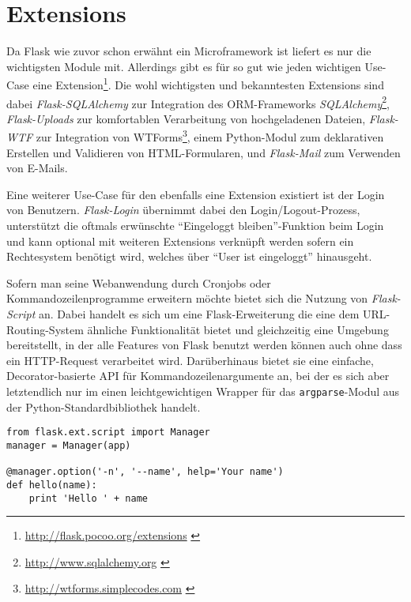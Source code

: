 \section{Extensions}

Da Flask wie zuvor schon erwähnt ein Microframework ist liefert es nur die wichtigsten Module mit.
Allerdings gibt es für so gut wie jeden wichtigen Use-Case eine
Extension\footnote{\href{http://flask.pocoo.org/extensions}{http://flask.pocoo.org/extensions} \citep{flaskext}}.
Die wohl wichtigsten und bekanntesten Extensions sind dabei \emph{Flask-SQLAlchemy} zur Integration des
ORM-Frameworks
\emph{SQLAlchemy}\footnote{\href{http://www.sqlalchemy.org}{http://www.sqlalchemy.org} \citep{sqlalchemy}},
\emph{Flask-Uploads} zur komfortablen Verarbeitung von hochgeladenen Dateien, \emph{Flask-WTF} zur
Integration von
WTForms\footnote{\href{http://wtforms.simplecodes.com}{http://wtforms.simplecodes.com} \citep{wtforms}}, einem
Python-Modul zum deklarativen Erstellen und Validieren von HTML-Formularen, und \emph{Flask-Mail}
zum Verwenden von E-Mails.

Eine weiterer Use-Case für den ebenfalls eine Extension existiert ist der Login von Benutzern.
\emph{Flask-Login} übernimmt dabei den Login/Logout-Prozess, unterstützt die oftmals erwünschte
\enquote{Eingeloggt bleiben}-Funktion beim Login und kann optional mit weiteren Extensions verknüpft
werden sofern ein Rechtesystem benötigt wird, welches über \enquote{User ist eingeloggt} hinausgeht.

Sofern man seine Webanwendung durch Cronjobs oder Kommandozeilenprogramme erweitern möchte bietet
sich die Nutzung von \emph{Flask-Script} an. Dabei handelt es sich um eine Flask-Erweiterung die
eine dem URL-Routing-System ähnliche Funktionalität bietet und gleichzeitig eine Umgebung
bereitstellt, in der alle Features von Flask benutzt werden können auch ohne dass ein HTTP-Request
verarbeitet wird. Darüberhinaus bietet sie eine einfache, Decorator-basierte API für
Kommandozeilenargumente an, bei der es sich aber letztendlich nur im einen leichtgewichtigen Wrapper
für das \lstinline{argparse}-Modul aus der Python-Standardbibliothek handelt.

\begin{lstlisting}[caption=Flask-Script]
from flask.ext.script import Manager
manager = Manager(app)

@manager.option('-n', '--name', help='Your name')
def hello(name):
    print 'Hello ' + name
\end{lstlisting}

